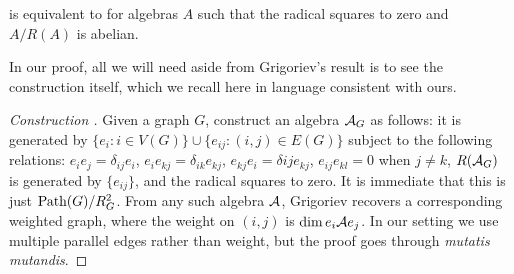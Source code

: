 \documentclass[11pt]{article}
\begin{document}
\begin{theorem} \label{thm:grigoriev}
\GIlong is equivalent to \AlgIsolong for algebras $A$ such that the radical squares to zero and $A/R(A)$ is abelian.
\end{theorem}

In our proof, all we will need aside from Grigoriev's result is to see the construction itself, which we recall here in language consistent with ours.

\begin{proof}[Construction \cite{Grigoriev83}]
Given a graph $G$, construct an algebra $\mathcal{A}_G$ as follows: it is generated by $\{e_i : i \in V(G)\} \cup \{e_{ij} : (i,j) \in E(G)\}$ subject to the following relations: $e_i e_j = \delta_{ij} e_i$, $e_i e_{kj} = \delta_{ik} e_{kj}$, $e_{kj}e_i = \delta{ij} e_{kj}$, $e_{ij} e_{kl} = 0$ when $j \neq k$, $R(\mathcal{A}_G)$ is generated by $\{e_{ij}\}$, and the radical squares to zero. It is immediate that this is just $\text{Path}(G) / R_G^2$. From any such algebra $\mathcal{A}$, Grigoriev recovers a corresponding weighted graph, where the weight on $(i,j)$ is $\dim e_i \mathcal{A} e_j$. In our setting we use multiple parallel edges rather than weight, but the proof goes through \emph{mutatis mutandis}.
\end{proof}
\end{document}
